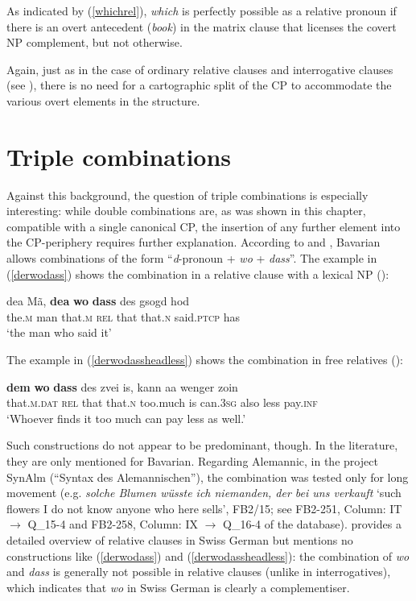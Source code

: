 \ea
{}
\z
\z

As indicated by (\ref{whichrel}), \textit{which} is perfectly possible as a relative pronoun if there is an overt antecedent (\textit{book}) in the matrix clause that licenses the covert NP complement, but not otherwise.

Again, just as in the case of ordinary relative clauses and interrogative clauses (see ), there is no need for a cartographic split of the CP to accommodate the various overt elements in the structure.

\section{Triple combinations} \label{sec:4triple}
Against this background, the question of triple combinations is especially interesting: while double combinations are, as was shown in this chapter, compatible with a single canonical CP, the insertion of any further element into the CP-periphery requires further explanation. According to \citet{weiss2013} and \citet{grewendorfpoletto2015}, Bavarian allows combinations of the form ``\textit{d}-pronoun + \textit{wo} + \textit{dass}''. The example in (\ref{derwodass}) shows the combination in a relative clause with a lexical NP (\citealt[781]{weiss2013}):

\ea \gll dea Mã, \textbf{dea} \textbf{wo} \textbf{dass} des gsogd hod \label{derwodass}\\
the.\textsc{m} man that.\textsc{m} \textsc{rel} that that.\textsc{n} said.\textsc{ptcp} has\\
\glt `the man who said it'
\z

The example in (\ref{derwodassheadless}) shows the combination in free relatives (\citealt[781, ex. 21e]{weiss2013}):

\ea \gll \textbf{dem} \textbf{wo} \textbf{dass} des zvei is, kann aa wenger zoin \label{derwodassheadless}\\
that.\textsc{m.dat} \textsc{rel} that that.\textsc{n} too.much is can.\textsc{3sg} also less pay.\textsc{inf}\\
\glt `Whoever finds it too much can pay less as well.'
\z

Such constructions do not appear to be predominant, though. In the literature, they are only mentioned for Bavarian. Regarding Alemannic, in the project SynAlm (``Syntax des Alemannischen''), the combination was tested only for long movement (e.g. \textit{solche Blumen wüsste ich niemanden, der bei uns verkauft} `such flowers I do not know anyone who here sells', FB2/15; see FB2-251, Column: IT $\rightarrow$ Q\_15-4 and FB2-258, Column: IX $\rightarrow$ Q\_16-4 of the database). \citet[336--343]{salzmann2017} provides a detailed overview of relative clauses in Swiss German but mentions no constructions like (\ref{derwodass}) and (\ref{derwodassheadless}): the combination of \textit{wo} and \textit{dass} is generally not possible in relative clauses (unlike in interrogatives), which indicates that \textit{wo} in Swiss German is clearly a complementiser.

